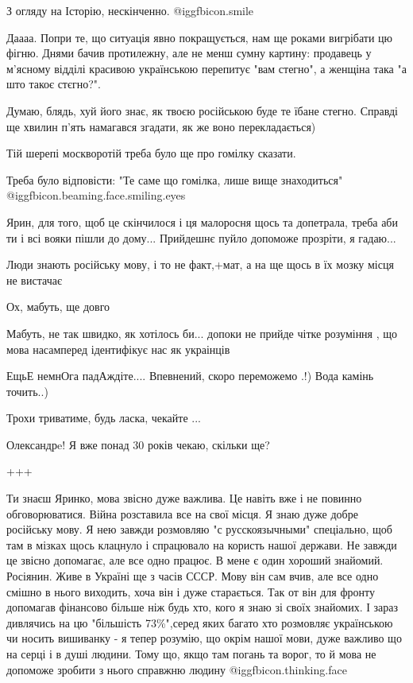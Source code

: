 \begin{itemize}
З огляду на Історію, нескінченно.  @igg{fbicon.smile} 


Даааа. Попри те, що ситуація явно покращується, нам ще роками вигрібати цю
фігню. Днями бачив протилежну, але не менш сумну картину: продавець у м'ясному
відділі красивою українською перепитує "вам стегно", а женщіна така "а што
такоє стєгно?".

Думаю, блядь, хуй його знає, як твоєю російською буде те їбане стегно. Справді
ще хвилин п'ять намагався згадати, як же воно перекладається)

\begin{itemize} %
Тій шерепі москворотій треба було ще про гомілку сказати.

Треба було відповісти: "Те саме що гомілка, лише вище знаходиться"
 @igg{fbicon.beaming.face.smiling.eyes} 
\end{itemize} %


Ярин, для того, щоб це скінчилося і ця малоросня щось та допетрала, треба аби
ти і всі вояки пішли до дому... Прийдешнє пуйло допоможе прозріти, я гадаю...

Люди знають російську мову, і то не факт,+мат, а на ще щось в їх мозку місця не вистачає

Ох, мабуть, ще довго

Мабуть, не так швидко, як хотілось би... допоки не прийде чітке розуміння , що мова насамперед ідентифікує нас як украінців

ЕщьЕ немнОга падАждіте....
Впевнений, скоро переможемо .!) Вода камінь точить..)

Трохи триватиме, будь ласка, чекайте ...

\begin{itemize} %
Олександрe! Я вже понад 30 років чекаю, скільки ще?
\end{itemize} %

+++


Ти знаєш Яринко, мова звісно дуже важлива. Це навіть вже і не повинно
обговорюватися. Війна розставила все на свої місця. Я знаю дуже добре російську
мову. Я нею завжди розмовляю "с русскоязычными" спеціально, щоб там в мізках щось
клацнуло і спрацювало на користь нашої держави. Не завжди це звісно
допомагає, але все одно працює. В мене є один хороший знайомий. Росіянин. Живе в
Україні ще з часів СССР. Мову він сам вчив, але все одно смішно в нього
виходить, хоча він і дуже старається. Так от він для фронту допомагав фінансово
більше ніж будь хто, кого я знаю зі своїх знайомих. І зараз дивлячись на цю
"більшість 73\%",серед яких багато хто розмовляє українською чи носить вишиванку
- я тепер розумію, що окрім нашої мови, дуже важливо що на серці і в душі
людини. Тому що, якщо там погань та ворог, то й мова не допоможе зробити з нього
справжню людину  @igg{fbicon.thinking.face} 


\end{itemize}
